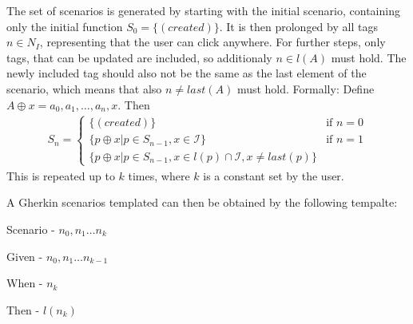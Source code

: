 The set of scenarios is generated by starting with the initial scenario, containing only the initial function $S_0 = \{(created)\}$. It is then prolonged by all tags $n \in N_I$, representing that the user can click anywhere. For further steps, only tags, that can be updated are included, so additionaly $n \in l(A)$ must hold. The newly included tag should also not be the same as the last element of the scenario, which means that also $n \neq last(A)$ must hold.
Formally:
Define $A \oplus x = a_0,a_1,\ldots,a_n,x$. Then
\begin{align}
    S_n = \begin{cases} 
        \{(created)\} &\mbox{if } n = 0 \\
        \{ p \oplus x |p \in S_{n-1}, x \in \mathcal{I}\} &\mbox{if } n = 1 \\
        \{ p \oplus x |p \in S_{n-1}, x \in l(p) \cap \mathcal{I}, x \neq last(p) \} 
    \end{cases}
\end{align}
This is repeated up to $k$ times, where $k$ is a constant set by the user. 

A Gherkin scenarios templated can then be obtained by the following tempalte:

Scenario - $n_0,n_1 \ldots n_k$

Given - $n_0, n_1 \ldots n_{k-1}$

When - $n_k$

Then - $l(n_k)$



